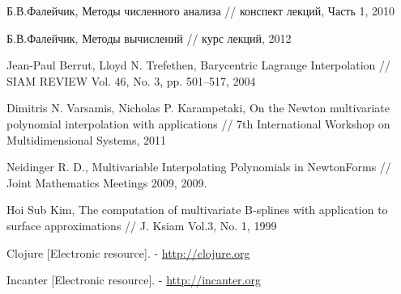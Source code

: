 \begin{thebibliography}{20}

  Б.В.Фалейчик,
  Методы численного анализа //
  конспект лекций, Часть 1,
  2010

  Б.В.Фалейчик,
  Методы вычислений //
  курс лекций,
  2012

  Jean-Paul Berrut, Lloyd N. Trefethen,
  Barycentric Lagrange Interpolation //
  SIAM REVIEW Vol. 46, No. 3, pp. 501–517,
  2004

  Dimitris N. Varsamis, Nicholas P. Karampetaki,
  On the Newton multivariate polynomial interpolation with applications //
  7th International Workshop on Multidimensional Systems,
  2011

  Neidinger R. D.,
  Multivariable Interpolating Polynomials in NewtonForms //
  Joint Mathematics Meetings 2009,
  2009.

  Hoi Sub Kim,
  The computation of multivariate B-splines with application to surface approximations //
  J. Ksiam Vol.3, No. 1,
  1999

  Clojure [Electronic resource]. - \url{http://clojure.org}

  Incanter [Electronic resource]. - \url{http://incanter.org}



\end{thebibliography}

